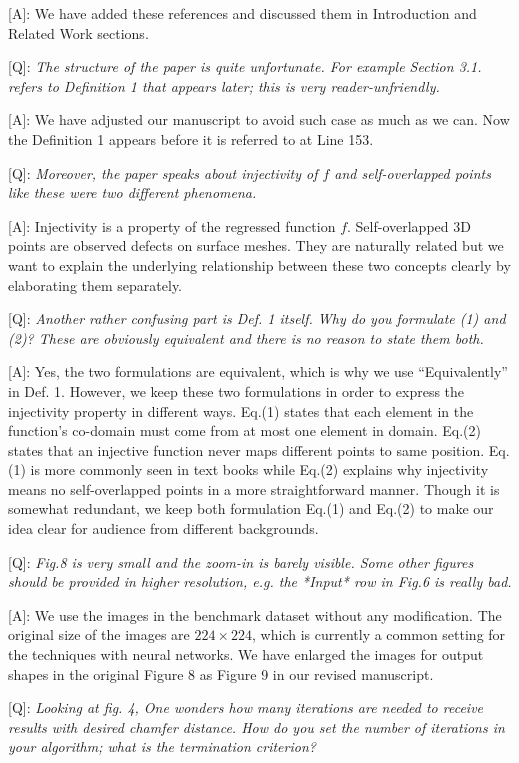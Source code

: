 \documentclass[10pt]{letter} %
\begin{document}
	[A]: We have added these references and discussed them in Introduction and Related Work sections.
	
	[Q]: \emph{The structure of the paper is quite unfortunate. For example Section 3.1. refers to Definition 1 that appears later; this is very reader-unfriendly.}
	
	[A]: We have adjusted our manuscript to avoid such case as much as we can. Now the Definition 1 appears before it is referred to at Line 153.
	
	[Q]: \emph{Moreover, the paper speaks about injectivity of $f$ and self-overlapped points like these were two different phenomena.}
	
	[A]: Injectivity is a property of the regressed function $f$. Self-overlapped 3D points are observed defects on surface meshes. They are naturally related but we want to explain the underlying relationship between these two concepts clearly by elaborating them separately.
	
	[Q]: \emph{Another rather confusing part is Def. 1 itself. Why do you formulate (1) and (2)? These are obviously equivalent and there is no reason to state them both.}
	
	[A]: Yes, the two formulations are equivalent, which is why we use ``Equivalently'' in Def. 1. However, we keep these two formulations in order to express the injectivity property in different ways. Eq.(1) states that each element in the function's co-domain must come from at most one element in domain. Eq.(2) states that an injective function never maps different points to same position. Eq.(1) is more commonly seen in text books while Eq.(2) explains why injectivity means no self-overlapped points in a more straightforward manner. Though it is somewhat redundant, we keep both formulation Eq.(1) and Eq.(2) to make our idea clear for audience from different backgrounds.
	
	[Q]: \emph{Fig.8 is very small and the zoom-in is barely visible.  Some other figures should be provided in higher resolution, e.g. the *Input* row in Fig.6 is really bad.} 
	
	[A]: We use the images in the benchmark dataset without any modification. The original size of the images are $224 \times 224$, which is currently a common setting for the techniques with neural networks. We have enlarged the images for output shapes in the original Figure 8 as Figure 9 in our revised manuscript.
	
	[Q]: \emph{Looking at fig. 4, One wonders how many iterations are needed to receive results with desired chamfer distance. How do you set the number of iterations in your algorithm; what is the termination criterion?}
	
\end{document}
